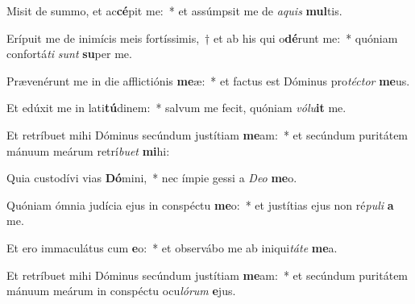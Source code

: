 \item Misit de summo, et ac\textbf{cé}pit me:~* et assúmpsit me de \textit{a}\textit{quis} \textbf{mul}tis.
\item Erípuit me de inimícis meis fortíssimis,~† et ab his qui o\textbf{dé}runt me:~* quóniam confortá\textit{ti} \textit{sunt} \textbf{su}per me.
\item Prævenérunt me in die afflictiónis \textbf{me}æ:~* et factus est Dóminus pro\textit{téc}\textit{tor} \textbf{me}us.
\item Et edúxit me in lati\textbf{tú}dinem:~* salvum me fecit, quóniam \textit{vó}\textit{lu}\textbf{it} me.
\item Et retríbuet mihi Dóminus secúndum justítiam \textbf{me}am:~* et secúndum puritátem mánuum meárum retrí\textit{bu}\textit{et} \textbf{mi}hi:
\item Quia custodívi vias \textbf{Dó}mini,~* nec ímpie gessi a \textit{De}\textit{o} \textbf{me}o.
\item Quóniam ómnia judícia ejus in conspéctu \textbf{me}o:~* et justítias ejus non ré\textit{pu}\textit{li} \textbf{a} me.
\item Et ero immaculátus cum \textbf{e}o:~* et observábo me ab iniqui\textit{tá}\textit{te} \textbf{me}a.
\item Et retríbuet mihi Dóminus secúndum justítiam \textbf{me}am:~* et secúndum puritátem mánuum meárum in conspéctu ocu\textit{ló}\textit{rum} \textbf{e}jus.
